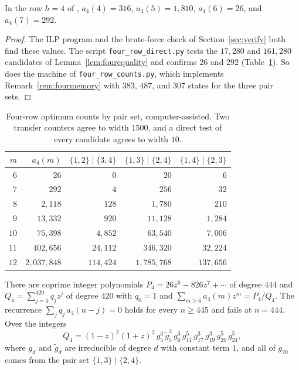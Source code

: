\begin{proposition}\label{prop:fourvalues}
In the row $h=4$ of , $a_4(4)=316$, $a_4(5)=1{,}810$, $a_4(6)=26$, and $a_4(7)=292$.
\end{proposition}

\begin{proof}
The ILP program and the brute-force check of Section~\ref{sec:verify} both find these values. The script \texttt{four\_row\_direct.py} tests the $17{,}280$ and $161{,}280$ candidates of Lemma~\ref{lem:fourequality} and confirms $26$ and $292$ (Table~\ref{tab:fourvalues}). So does the machine of \texttt{four\_row\_counts.py}, which implements Remark~\ref{rem:fourmemory} with $383$, $487$, and $307$ states for the three pair sets.
\end{proof}

\begin{table}[htbp]
\centering\small
\begin{tabular}{@{}rrrrr@{}}
\toprule
$m$ & $a_4(m)$ & $\{1,2\}\mid\{3,4\}$ & $\{1,3\}\mid\{2,4\}$ & $\{1,4\}\mid\{2,3\}$\\
\midrule
$6$ & $26$ & $0$ & $20$ & $6$\\
$7$ & $292$ & $4$ & $256$ & $32$\\
$8$ & $2{,}118$ & $128$ & $1{,}780$ & $210$\\
$9$ & $13{,}332$ & $920$ & $11{,}128$ & $1{,}284$\\
$10$ & $75{,}398$ & $4{,}852$ & $63{,}540$ & $7{,}006$\\
$11$ & $402{,}656$ & $24{,}112$ & $346{,}320$ & $32{,}224$\\
$12$ & $2{,}037{,}848$ & $114{,}424$ & $1{,}785{,}768$ & $137{,}656$\\
\bottomrule
\end{tabular}
\caption{Four-row optimum counts by pair set, computer-assisted. Two transfer counters agree to width $1500$, and a direct test of every candidate agrees to width $10$.}
\label{tab:fourvalues}
\end{table}

\begin{theorem}\label{thm:fourgfexact}
There are coprime integer polynomials $P_4=26z^6-826z^7+\cdots$ of degree $444$ and $Q_4=\sum_{j=0}^{420}q_jz^j$ of degree $420$ with $q_0=1$ and $\sum_{m\ge6}a_4(m)z^m=P_4/Q_4$. The recurrence $\sum_jq_j\,a_4(n-j)=0$ holds for every $n\ge445$ and fails at $n=444$. Over the integers
\[
Q_4=(1-z)^2(1+z)^2\,g_5^3\,\tilde g_5^3\,g_6^3\,g_{11}^5\,g_{17}^3\,g_{19}^3\,g_{20}^5\,g_{21}^5,
\]
where $g_d$ and $\tilde g_d$ are irreducible of degree $d$ with constant term $1$, and all of $g_{20}$ comes from the pair set $\{1,3\}\mid\{2,4\}$.
\end{theorem}

